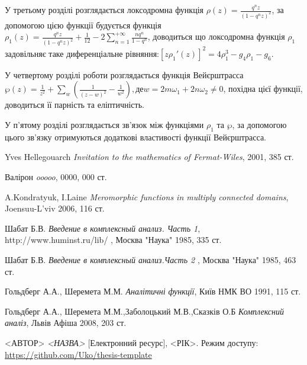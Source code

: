 \documentclass[12pt,a4paper]{article}
\begin{document}
У третьому розділі розглядається локсодромна функція $
\rho(z)=\frac{q^{n}z}{(1-q^{n}z)^{2}}$, за допомогою цією функції
будується функція $
\rho_{1}(z)=\frac{q^{n}z}{(1-q^{n}z)^{2}}+\frac{1}{12}-2\sum_{n=1}^{+\infty}\frac{nq^{n}}{1-q^{n}}$,
доводиться що локсодромна функція $ \rho_{1}$ задовільняє таке
диференціальне
рівняння:$[z\rho_{1}'(z)]^{2}=4\rho_{1}^{3}-g_{4}\rho_{1}-g_{6} $.

У четвертому розділі роботи розглядається функція Вейєрштрасса
$\wp(z)=\frac{1}{z^{2}}+\sum_{w}(\frac{1}{(z-w)^{2}}-\frac{1}{w^{2}}),
де w=2m\omega_{1}+2n\omega_{2}\neq0 $, похідна цієї функції,
доводиться її парність та еліптичність.

У п'ятому розділі розглядається зв'язок між функціями $\rho_{1}$
та $\wp$, за допомогою цього зв'язку отримуються додаткові
властивості функції Вейєрштрасса.
\clearpage

\renewcommand\refname{Використана література}
\begin{thebibliography}{9}

  Yves Hellegouarch \emph{Invitation to the mathematics of Fermat-Wiles},
    2001, 385 ст.

  Валірон \emph{ooooo},
    0000, 000 ст.
    
   A.Kondratyuk, I.Laine \emph{Meromorphic functions in multiply connected domains},
    Joensuu-L'viv 2006, 116 ст.
    
  Шабат Б.В. \emph{Введение в комплексный анализ. Часть 1}, http://www.huminst.ru/lib/%
    , Москва "Наука" 1985, 335 ст.    

 Шабат Б.В. \emph{Введение в комплексный анализ.Часть 2 },
    Москва "Наука" 1985, 463 ст. 
        
  Гольдберг А.А., Шеремета М.М. \emph{Аналітичні функції},
    Київ НМК ВО 1991, 115 ст.

  Гольдберг А.А., Шеремета М.М.,Заболоцький М.В.,Сказків О.Б \emph{Комплексний аналіз},
    Львів Афіша 2008, 203 ст.
          
  <АВТОР> \emph{<НАЗВА>} [Електронний ресурс],
    <РІК>. Режим доступу:
    \url{https://github.com/Uko/thesis-template}

\end{thebibliography}
\end{document}
